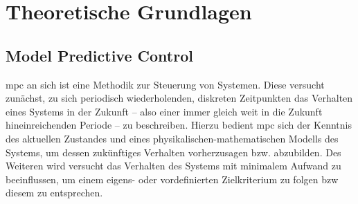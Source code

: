 %

\chapter{Theoretische Grundlagen}
\label{chap:theoretischegrundlagen}

\section{Model Predictive Control}
\label{chap:mpc}


\acrlong{mpc} an sich ist eine Methodik zur Steuerung von Systemen. Diese versucht zunächst, zu sich periodisch wiederholenden, diskreten Zeitpunkten das Verhalten eines Systems in der Zukunft -- also einer immer gleich weit in die Zukunft hineinreichenden Periode -- zu beschreiben. Hierzu bedient \acrlong{mpc} sich der Kenntnis des aktuellen Zustandes und eines physikalischen-mathematischen Modells des Systems, um dessen zukünftiges Verhalten \Gun vorherzusagen \Gob bzw. abzubilden. Des Weiteren wird versucht das Verhalten des Systems mit minimalem Aufwand zu beeinflussen, um einem eigens- oder vordefinierten Zielkriterium zu folgen \acrlong{bzw} diesem zu entsprechen.

